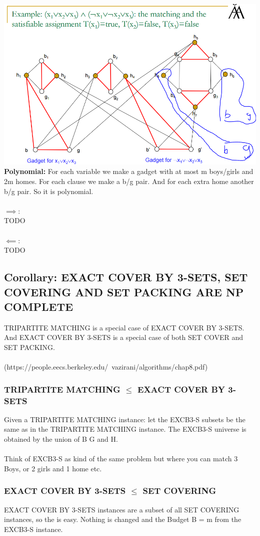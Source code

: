 \includegraphics[scale=0.5]{tripartite}
\\
\textbf{Polynomial:} For each variable we make a gadget with at most m boys/girls and 2m homes. For each clause we make a b/g pair. And for each extra home another b/g pair. So it is polynomial.
\\\\
$\implies:$ \\ TODO
\\\\ 
$\impliedby:$ \\ TODO

\newpage
\subsection{Corollary: EXACT COVER BY 3-SETS, SET COVERING AND SET PACKING ARE NP COMPLETE}
TRIPARTITE MATCHING is a special case of EXACT COVER BY 3-SETS. And EXACT COVER BY 3-SETS is a special case of both SET COVER and SET PACKING.\\\\ (https://people.eecs.berkeley.edu/~vazirani/algorithms/chap8.pdf)
\subsubsection{TRIPARTITE MATCHING $\le$ EXACT COVER BY 3-SETS}
Given a TRIPARTITE MATCHING instance: let the EXCB3-S subsets be the same as in the TRIPARTITE MATCHING instance. The EXCB3-S universe is obtained by the union of B G and H.\\\\
Think of EXCB3-S as kind of the same problem but where you can match 3 Boys, or 2 girls and 1 home etc. 
\subsubsection{EXACT COVER BY 3-SETS $\le$ SET COVERING}
EXACT COVER BY 3-SETS instances are a subset of all SET COVERING instances, so the is easy. Nothing is changed and the Budget B = m from the EXCB3-S instance.

